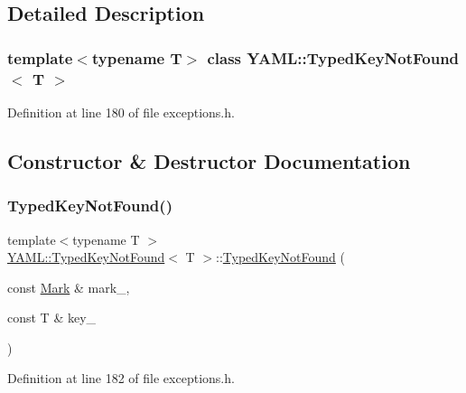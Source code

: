 \subsection{Detailed Description}
\subsubsection*{template$<$typename T$>$\newline
class Y\+A\+M\+L\+::\+Typed\+Key\+Not\+Found$<$ T $>$}



Definition at line 180 of file exceptions.\+h.



\subsection{Constructor \& Destructor Documentation}
\mbox{\label{class_y_a_m_l_1_1_typed_key_not_found_a134f072998bef18a9df88821b5c7f676}} 
\subsubsection{\texorpdfstring{TypedKeyNotFound()}{TypedKeyNotFound()}}
{\footnotesize\ttfamily template$<$typename T $>$ \\
\mbox{\hyperlink{class_y_a_m_l_1_1_typed_key_not_found}{Y\+A\+M\+L\+::\+Typed\+Key\+Not\+Found}}$<$ T $>$\+::\mbox{\hyperlink{class_y_a_m_l_1_1_typed_key_not_found}{Typed\+Key\+Not\+Found}} (\begin{DoxyParamCaption}\item[{const \mbox{\hyperlink{struct_y_a_m_l_1_1_mark}{Mark}} \&}]{mark\+\_\+,  }\item[{const T \&}]{key\+\_\+ }\end{DoxyParamCaption})\hspace{0.3cm}{\ttfamily [inline]}}



Definition at line 182 of file exceptions.\+h.

\mbox{\label{class_y_a_m_l_1_1_typed_key_not_found_a62707b7744d89b4120bc07829a3af14d}} 
